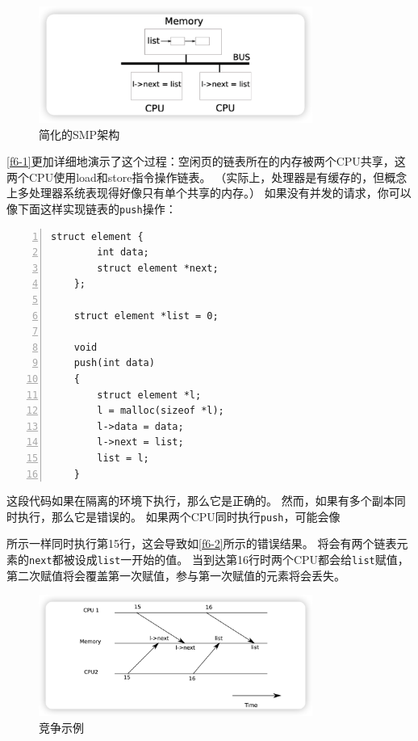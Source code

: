 \begin{figure}[htbp]
    \centering
    \includegraphics[width=0.8\textwidth]{../imgs/f6-1.png}
    \caption{简化的SMP架构}
    \label{f6-1}
\end{figure}

\autoref{f6-1}更加详细地演示了这个过程：空闲页的链表所在的内存被两个CPU共享，这两个CPU使用load和store指令操作链表。
（实际上，处理器是有缓存的，但概念上多处理器系统表现得好像只有单个共享的内存。）
如果没有并发的请求，你可以像下面这样实现链表的\texttt{push}操作：
\begin{lstlisting}[numbers=left]
    struct element {
        int data;
        struct element *next;
    };

    struct element *list = 0;

    void
    push(int data)
    {
        struct element *l;
        l = malloc(sizeof *l);
        l->data = data;
        l->next = list;
        list = l;
    }
\end{lstlisting}

这段代码如果在隔离的环境下执行，那么它是正确的。
然而，如果有多个副本同时执行，那么它是错误的。
如果两个CPU同时执行\texttt{push}，可能会像\author{f6-1}所示一样同时执行第15行，这会导致如\autoref{f6-2}所示的错误结果。
将会有两个链表元素的\texttt{next}都被设成\texttt{list}一开始的值。
当到达第16行时两个CPU都会给\texttt{list}赋值，第二次赋值将会覆盖第一次赋值，参与第一次赋值的元素将会丢失。

\begin{figure}[htbp]
    \centering
    \includegraphics[width=0.8\textwidth]{../imgs/f6-2.png}
    \caption{竞争示例}
    \label{f6-2}
\end{figure}

